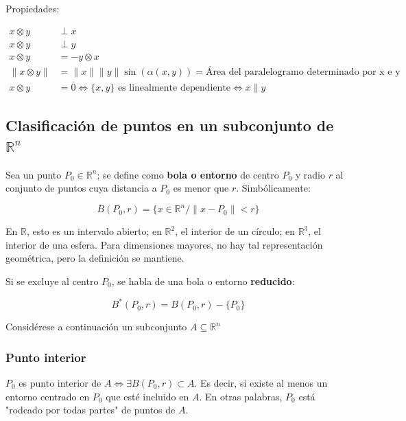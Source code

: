\documentclass{article}
\renewcommand{\Bbb}{\mathbb}
\begin{document}
Propiedades:

\begin{subequations}
\begin{align}
x \otimes y & \perp x \\
x \otimes y & \perp y \\
x \otimes y & = -y \otimes x \\
\| x \otimes y \| & = \|x\| \|y\| \sin(\alpha(x,y)) = \text{Área del paralelogramo determinado por x e y} \\
x \otimes y & = \overline{0} \Longleftrightarrow \{x, y\} \text{ es linealmente dependiente} \Longleftrightarrow x \parallel y
\end{align}
\end{subequations}

\subsection{Clasificación de puntos en un subconjunto de $\Bbb R^n$}

Sea un punto $P_0 \in \Bbb R^n$; se define como \textbf{bola o entorno} de centro $P_0$ y radio $r$ al conjunto de puntos cuya distancia a $P_0$ es menor que $r$. Simbólicamente:

\begin{equation}
B(P_0, r) = \{ x \in \Bbb R^n / \| x - P_0 \| < r \}
\end{equation}

En $\Bbb R$, esto es un intervalo abierto; en $\Bbb R^2$, el interior de un círculo; en $\Bbb R^3$, el interior de una esfera. Para dimensiones mayores, no hay tal representación geométrica, pero la definición se mantiene.

Si se excluye al centro $P_0$, se habla de una bola o entorno \textbf{reducido}:

\begin{equation}
B^*(P_0, r) = B(P_0, r) - \{ P_0 \}
\end{equation}

Considérese a continuación un subconjunto $A \subseteq \Bbb R^n$

\subsubsection{Punto interior}

$P_0$ es punto interior de $A \Longleftrightarrow \exists B(P_0, r) \subset A$. Es decir, si existe al menos un entorno centrado en $P_0$ que esté incluido en $A$. En otras palabras, $P_0$ está "rodeado por todas partes" de puntos de $A$.
\end{document}
